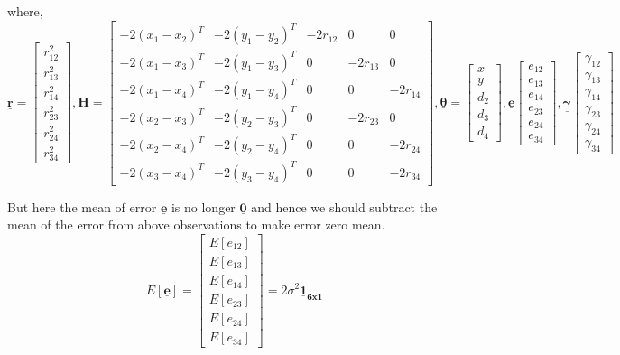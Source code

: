 \documentclass[a4 paper]{article}
\begin{document}
where, 
\[
\mathbf{\underline{r}} =
\begin{bmatrix}
r_{12}^{2} \\ r_{13}^{2} \\ r_{14}^{2} \\ r_{23}^{2} \\ r_{24}^{2} \\ r_{34}^{2} 
\end{bmatrix},
\mathbf{H} = 
\begin{bmatrix}
- 2(x_{1} - x_{2})^{T} & - 2(y_{1} - y_{2})^{T} & -2r_{12} & 0 & 0  \\
- 2(x_{1} - x_{3})^{T} & - 2(y_{1} - y_{3})^{T} & 0 & -2r_{13} & 0  \\
- 2(x_{1} - x_{4})^{T} & - 2(y_{1} - y_{4})^{T} & 0 & 0 & -2r_{14}  \\
- 2(x_{2} - x_{3})^{T} & - 2(y_{2} - y_{3})^{T} & 0 & -2r_{23} & 0  \\
- 2(x_{2} - x_{4})^{T} & - 2(y_{2} - y_{4})^{T} & 0 & 0 & -2r_{24}  \\
- 2(x_{3} - x_{4})^{T} & - 2(y_{3} - y_{4})^{T} & 0 & 0 & -2r_{34} 
\end{bmatrix},
\mathbf{\underline{\theta}} = 
\begin{bmatrix}
x \\ y \\ d_{2} \\ d_{3} \\ d_{4}
\end{bmatrix},
\mathbf{\underline{e}}
\begin{bmatrix}
e_{12} \\ e_{13} \\ e_{14} \\ e_{23} \\ e_{24} \\ e_{34}
\end{bmatrix},
\mathbf{\underline{\gamma}}
\begin{bmatrix}
\gamma_{12} \\ \gamma_{13} \\ \gamma_{14} \\ \gamma_{23} \\ \gamma_{24} \\ \gamma_{34} 
\end{bmatrix}
\]

\vspace{1em}
But here the mean of error $\mathbf{\underline{e}}$ is no longer $\mathbf{\underline{0}}$ and hence we should subtract the mean of the error from above observations to make error zero mean.
\[
E[\mathbf{\underline{e}}]=
\begin{bmatrix}
E[e_{12}] \\ E[e_{13}] \\ E[e_{14}] \\ E[e_{23}] \\ E[e_{24}] \\ E[e_{34}] 
\end{bmatrix}
=
2\sigma^{2}\mathbf{\underline{1}_{6x1}}
\]
\end{document}
